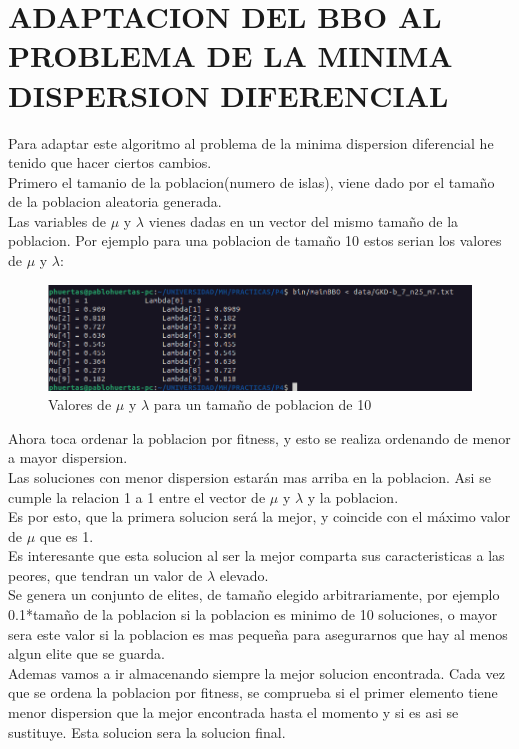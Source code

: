 \documentclass{article}
\begin{document}
\section{\large ADAPTACION DEL BBO AL PROBLEMA DE LA MINIMA DISPERSION DIFERENCIAL}
Para adaptar este algoritmo al problema de la minima dispersion diferencial he tenido que hacer ciertos cambios.\\

Primero el tamanio de la poblacion(numero de islas), viene dado por el tamaño de la poblacion aleatoria generada. \\
Las variables de $\mu$ y $\lambda$ vienes dadas en un vector del mismo tamaño de la poblacion. Por ejemplo para una 
poblacion de tamaño 10 estos serian los valores de $\mu$ y $\lambda$:

\begin{figure}[h]
  \centering
  \includegraphics[scale=0.5]{MuLa.png}
  \caption{Valores de $\mu$ y $\lambda$ para un tamaño de poblacion de 10}
\end{figure}

\vspace{3mm}
Ahora toca ordenar la poblacion por fitness, y esto se realiza ordenando de menor a mayor dispersion. \\
Las soluciones con menor dispersion estarán mas arriba en la poblacion. Asi se cumple la relacion 1 a 1 entre el 
vector de $\mu$ y $\lambda$ y la poblacion.\\
Es por esto, que la primera solucion será la mejor, y coincide con el máximo valor de $\mu$ que es 1.\\
Es interesante que esta solucion al ser la mejor comparta sus caracteristicas a las peores, que tendran un valor 
de $\lambda$ elevado.\\

Se genera un conjunto de elites, de tamaño elegido arbitrariamente, por ejemplo 0.1*tamaño de la poblacion si la 
poblacion es minimo de 10 soluciones, o mayor sera este valor si la poblacion es mas pequeña para asegurarnos que hay 
al menos algun elite que se guarda.\\

Ademas vamos a ir almacenando siempre la mejor solucion encontrada. Cada vez que se ordena la poblacion por fitness, se 
comprueba si el primer elemento tiene menor dispersion que la mejor encontrada hasta el momento y si es asi 
se sustituye. Esta solucion sera la solucion final.\\
\end{document}
